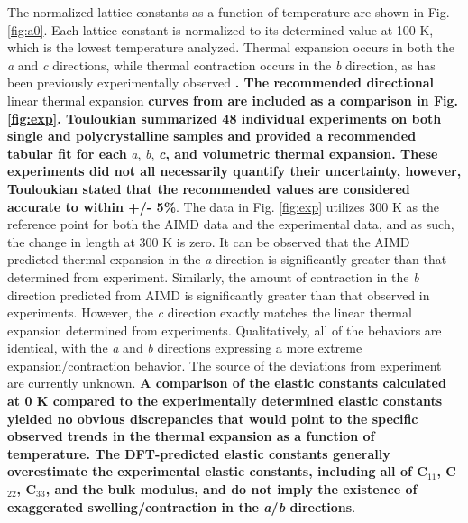 \documentclass[utf8]{frontiersSCNS} %
\providecommand{\DIFaddtex}[1]{{\bf #1}} %
\providecommand{\DIFdeltex}[1]{} %
\providecommand{\DIFaddbegin}{\protect\color{blue}} %
\providecommand{\DIFaddend}{\protect\color{black}} %
\providecommand{\DIFdelbegin}{\protect\color{red}} %
\providecommand{\DIFdelend}{\protect\color{black}} %
\providecommand{\DIFadd}[1]{\texorpdfstring{\DIFaddtex{#1}}{#1}} %
\providecommand{\DIFdel}[1]{\texorpdfstring{\DIFdeltex{#1}}{}} %
\begin{document}
The normalized lattice constants as a function of temperature are shown in Fig. \ref{fig:a0}. Each lattice constant is normalized to its determined value at 100 K, which is the lowest temperature analyzed. Thermal expansion occurs in both the \textit{a} and \textit{c} directions, while thermal contraction occurs in the \textit{b} direction, as has been previously experimentally observed \DIFdelbegin \DIFdel{\cite{grenthe2010}. Average values for }\DIFdelend \DIFaddbegin \DIFadd{\cite{touloukian}. The recommended directional }\DIFaddend linear thermal expansion \DIFdelbegin \DIFdel{coefficients of $\alpha$-U for the }\DIFdelend \DIFaddbegin \DIFadd{curves from \cite{touloukian} are included as a comparison in Fig. \ref{fig:exp}. Touloukian summarized 48 individual experiments on both single and polycrystalline samples and provided a recommended tabular fit for each }\DIFaddend \textit{a}, \textit{b}, \DIFdelbegin \DIFdel{and \textit{c}crystallographic directions were experimentally determined to be 26.5$\times$10$^{-6}$ K$^{-1}$, \mbox{-2.4$\times$10$^{-6}$ K$^{-1}$}, and 23.9$\times$10$^{-6}$ K$^{-1}$, respectively, over the temperature range of 298-598 K \cite{grenthe2010, lloyd1966}}\DIFdelend \DIFaddbegin \DIFadd{\textit{c}, and volumetric thermal expansion. These experiments did not all necessarily quantify their uncertainty, however, Touloukian stated that the recommended values are considered accurate to within +/- 5\%}\DIFaddend . The data in Fig. \ref{fig:exp} utilizes 300 K as the reference point for both the AIMD data and the experimental data, and as such, the change in length at 300 K is zero. It can be observed that the AIMD predicted thermal expansion in the \textit{a} direction is significantly greater than that determined from experiment. Similarly, the amount of contraction in the \textit{b} direction predicted from AIMD is significantly greater than that observed in experiments. However, the \textit{c} direction exactly matches the linear thermal expansion determined from experiments. Qualitatively, all of the behaviors are identical, with the \textit{a} and \textit{b} directions expressing a more extreme expansion/contraction behavior. The source of the deviations from experiment are currently unknown. \DIFdelbegin \DIFdel{It should be noted that significant scatter exists in the experimental datasets utilized to generate the averages presented for comparison in Fig. \ref{fig:exp}, and additional experimental investigations are warranted in order to confirm previous findings}\DIFdelend \DIFaddbegin \DIFadd{A comparison of the elastic constants calculated at 0 K \cite{beeler2013}compared to the experimentally determined elastic constants \cite{fisher1958} yielded no obvious discrepancies that would point to the specific observed trends in the thermal expansion as a function of temperature. The DFT-predicted elastic constants generally overestimate the experimental elastic constants, including all of C$_{11}$, C$_{22}$, C$_{33}$, and the bulk modulus, and do not imply the existence of exaggerated swelling/contraction in the \textit{a}/\textit{b} directions}\DIFaddend .
\end{document}
